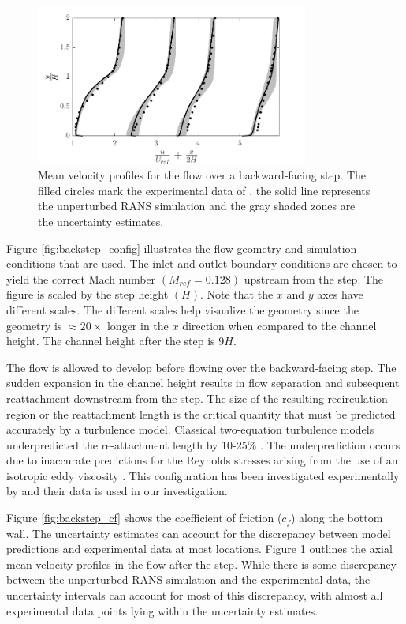 \begin{figure}
\centering
\includegraphics[width=0.8\textwidth]{code/image_gen/backstep/images/backstep_vel_prof.png}
\caption{Mean velocity profiles for the flow over a backward-facing step. The filled circles mark the experimental data of \cite{driver1985}, the solid line represents the unperturbed RANS simulation and the gray shaded zones are the uncertainty estimates.\label{fig:backstep_vel_prof}}
\end{figure}

Figure \ref{fig:backstep_config} illustrates the flow geometry and simulation conditions that are used.
The inlet and outlet boundary conditions are chosen to yield the correct Mach number $\left ( M_{ref} = 0.128 \right )$ upstream from the step.
The figure is scaled by the step height $\left ( H \right ) $.
Note that the $x$ and $y$ axes have different scales.
The different scales help visualize the geometry since the geometry is $\approx 20\times$ longer in the $x$ direction when compared to the channel height.
The channel height after the step is $9H$. 

The flow is allowed to develop before flowing over the backward-facing step.
The sudden expansion in the channel height results in flow separation and subsequent reattachment downstream from the step.
The size of the resulting recirculation region or the reattachment length is the critical quantity that must be predicted accurately by a turbulence model.
Classical two-equation turbulence models underpredicted the re-attachment length by 10-25\% \cite{thangam1991}.
The underprediction occurs due to inaccurate predictions for the Reynolds stresses arising from the use of an isotropic eddy viscosity \cite{thangam1991}.
This configuration has been investigated experimentally by \cite{driver1985} and their data is used in our investigation.

Figure \ref{fig:backstep_cf} shows the coefficient of friction ($c_f$) along the bottom wall.
The uncertainty estimates can account for the discrepancy between model predictions and experimental data at most locations.
Figure \ref{fig:backstep_vel_prof} outlines the axial mean velocity profiles in the flow after the step.
While there is some discrepancy between the unperturbed RANS simulation and the experimental data, the uncertainty intervals can account for most of this discrepancy, with almost all experimental data points lying within the uncertainty estimates. 

